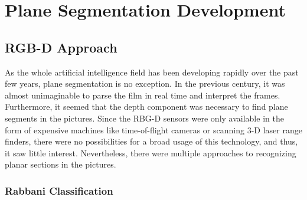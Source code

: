 
\chapter{Plane Segmentation Development} \label{chap:plane-segmentation-development}

\section{RGB-D Approach}

As the whole artificial intelligence field has been developing rapidly over the past few years, plane segmentation is no exception.
In the previous century, it was almost unimaginable to parse the film in real time and interpret the frames.
Furthermore, it seemed that the depth component was necessary to find plane segments in the pictures.
Since the RBG-D sensors were only available in the form of expensive machines
like time-of-flight cameras or scanning 3-D laser range finders, \cite{articleFPSLinePrimitivesRGBD}
there were no possibilities for a broad usage of this technology, and thus, it saw little interest.
Nevertheless, there were multiple approaches to recognizing planar sections in the pictures.

\subsection{Rabbani Classification}

